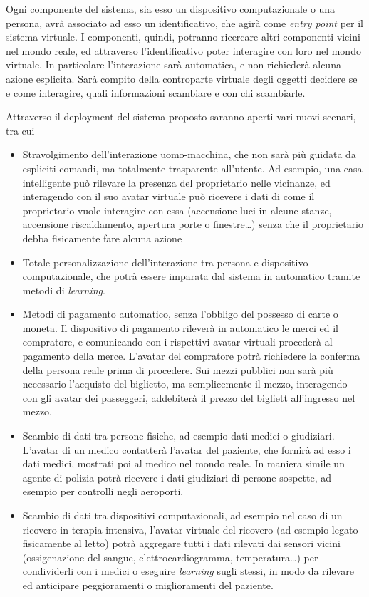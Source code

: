 \documentclass[a4paper,12pt]{report}
\begin{document}
Ogni componente del sistema, sia esso un dispositivo computazionale o una persona, avrà associato ad esso un identificativo, che agirà come \emph{entry point} per il sistema virtuale. I componenti, quindi, potranno ricercare altri componenti vicini nel mondo reale, ed attraverso l'identificativo poter interagire con loro nel mondo virtuale. In particolare l'interazione sarà automatica, e non richiederà alcuna azione esplicita. Sarà compito della controparte virtuale degli oggetti decidere se e come interagire, quali informazioni scambiare e con chi scambiarle.

Attraverso il deployment del sistema proposto saranno aperti vari nuovi scenari, tra cui
\begin{itemize}
	\item Stravolgimento dell'interazione uomo-macchina, che non sarà più guidata da espliciti comandi, ma totalmente trasparente all'utente. Ad esempio, una casa intelligente può rilevare la presenza del proprietario nelle vicinanze, ed interagendo con il suo avatar virtuale può ricevere i dati di come il proprietario vuole interagire con essa (accensione luci in alcune stanze, accensione riscaldamento, apertura porte o finestre\dots) senza che il proprietario debba fisicamente fare alcuna azione
	\item Totale personalizzazione dell'interazione tra persona e dispositivo computazionale, che potrà essere imparata dal sistema in automatico tramite metodi di \emph{learning}.
	\item Metodi di pagamento automatico, senza l'obbligo del possesso di carte o moneta. Il dispositivo di pagamento rileverà in automatico le merci ed il compratore, e comunicando con i rispettivi avatar virtuali procederà al pagamento della merce. L'avatar del compratore potrà richiedere la conferma della persona reale prima di procedere. Sui mezzi pubblici non sarà più necessario l'acquisto del biglietto, ma semplicemente il mezzo, interagendo con gli avatar dei passeggeri, addebiterà il prezzo del bigliett all'ingresso nel mezzo.
	\item Scambio di dati tra persone fisiche, ad esempio dati medici o giudiziari. L'avatar di un medico contatterà l'avatar del paziente, che fornirà ad esso i dati medici, mostrati poi al medico nel mondo reale. In maniera simile un agente di polizia potrà ricevere i dati giudiziari di persone sospette, ad esempio per controlli negli aeroporti. 
	\item Scambio di dati tra dispositivi computazionali, ad esempio nel caso di un ricovero in terapia intensiva, l'avatar virtuale del ricovero (ad esempio legato fisicamente al letto) potrà aggregare tutti i dati rilevati dai sensori vicini (ossigenazione del sangue, elettrocardiogramma, temperatura\dots) per condividerli con i medici o eseguire \emph{learning} sugli stessi, in modo da rilevare ed anticipare peggioramenti o miglioramenti del paziente.
\end{itemize}
\end{document}
